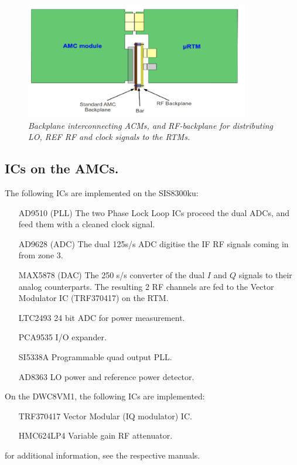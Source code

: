 \documentclass[12pt]{amsart}
\begin{document}
\begin{figure}[htbp] %
   \centering
   \includegraphics[height=2in]{im/RFbackplane.png}
   \caption{\em Backplane interconnecting ACMs, and RF-backplane for distributing LO, REF RF and clock signals to the RTMs.}
   \label{fig:bp}
\end{figure}







\subsection{ICs on the AMCs.}

The following ICs are implemented on the SIS8300ku:
\begin{itemize}
\item[AD9510] (PLL) The two Phase Lock Loop ICs proceed the dual ADCs, and feed them with a cleaned clock signal.
\item[AD9628] (ADC) The dual 125s/s ADC digitise the IF RF signals  coming in from zone 3.
\item[MAX5878] (DAC) The 250 s/s converter of the dual $I$ and $Q$ signals to their analog counterparts.
	The resulting 2 RF channels are fed to the Vector Modulator IC (TRF370417) on the RTM.
\item[LTC2493] 24 bit ADC for power measurement.
\item[PCA9535] I/O expander.
\item[SI5338A] Programmable quad output PLL.
\item[AD8363] LO power and reference power detector.
\end{itemize}

On the DWC8VM1, the following ICs are implemented:
\begin{itemize}
\item[TRF370417] Vector Modular (IQ modulator) IC.  
\item[HMC624LP4] Variable gain RF attenuator.
\end{itemize}
for additional information, see the respective manuals.
\end{document}
